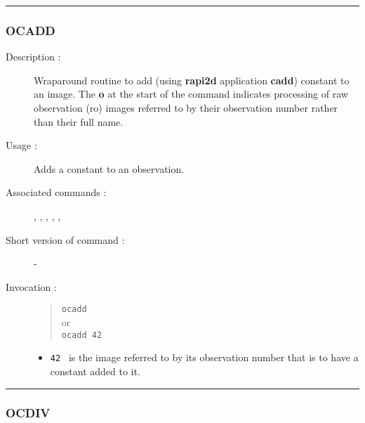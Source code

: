\hrule
\subsubsection*{\label{OCADD}OCADD}

\begin{description}

\item[Description :] Wraparound routine to add (using {\bf rapi2d}
application {\bf cadd}) constant to an image. The {\bf o} at the start of the
command indicates processing of raw observation ({\sc ro}) images
referred to by their observation number rather than their full name.

\item[Usage :] Adds a constant to an observation.

\item[Associated commands :] {\tt {}},
{\tt {}}, {\tt {}},
{\tt {}}, {\tt {}},
{\tt {}}

\item[Short version of command :] -
\item[Invocation :]

\begin{quote}{\tt  ocadd }\\
or \\
{\tt ocadd 42 }
\end{quote}

\begin{itemize}

\item {\tt 42 } is the image referred to by its observation number that
 is to have a constant added to it.
\end{itemize}

\end{description}

\hrule
\subsubsection*{\label{OCDIV}OCDIV}

